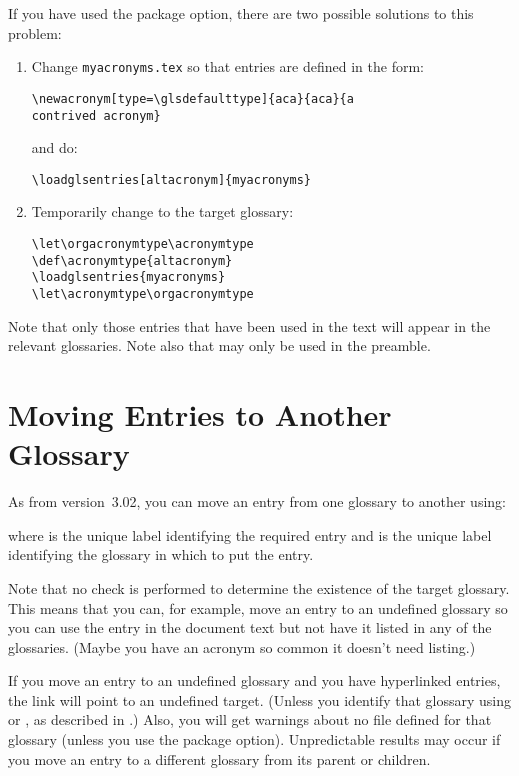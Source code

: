 \documentclass[report]{nlctdoc}
\begin{document}
If you have used the  package option,
there are two possible solutions to this problem:
\begin{enumerate}
\item Change \texttt{myacronyms.tex} so that entries are defined in
the form:
\begin{verbatim}
\newacronym[type=\glsdefaulttype]{aca}{aca}{a 
contrived acronym}
\end{verbatim}
and do:
\begin{verbatim}
\loadglsentries[altacronym]{myacronyms}
\end{verbatim}

\item Temporarily change  to the target glossary:
\begin{verbatim}
\let\orgacronymtype\acronymtype
\def\acronymtype{altacronym}
\loadglsentries{myacronyms}
\let\acronymtype\orgacronymtype
\end{verbatim}
\end{enumerate}

Note that only those entries that have been used
in the text will appear in the relevant glossaries.
Note also that  may only be used in the 
preamble.

\section{Moving Entries to Another Glossary}
\label{sec:moveentry}

As from version~3.02, you can move an entry from one glossary to
another using:
\begin{definition}[\DescribeMacro{\glsmoveentry}]
\end{definition}
where  is the unique label identifying the required
entry and  is the unique label
identifying the glossary in which to put the entry.

Note that no check is performed to determine the existence of
the target glossary. This means that you can, for example, move an
entry to an undefined glossary so you can use the entry in the
document text but not have it listed in any of the glossaries.
(Maybe you have an acronym so common it doesn't need listing.)

\begin{important}
If you move an entry to an undefined glossary and you have
hyperlinked entries, the link will point to an undefined target.
(Unless you identify that glossary using  or
, as described in .)
Also, you will get warnings about no file defined for that glossary
(unless you use the  package option). Unpredictable
results may occur if you move an entry to a different glossary from
its parent or children.
\end{important}
\end{document}
